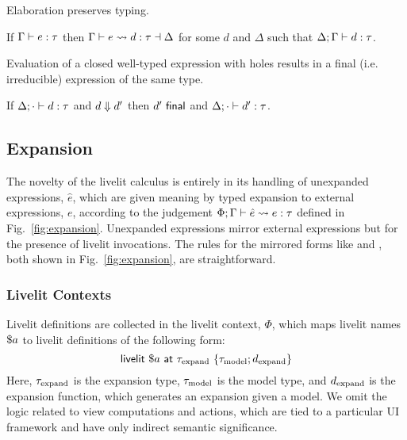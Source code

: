 Elaboration preserves typing.
\begin{theorem}
    If $\Gamma \vdash e : \tau$ then $\Gamma \vdash e \leadsto d : \tau \dashv \Delta$ for some $d$ and $\Delta$ such
    that $\Delta; \Gamma \vdash d : \tau$.
\end{theorem}

Evaluation of a closed well-typed expression with holes results in a final (i.e. irreducible) expression of the same type.
\begin{theorem}[Preservation]
    If $\Delta; \cdot \vdash d : \tau$ and $d \Downarrow d'$ then $d'~\mathsf{final}$ and $\Delta; \cdot \vdash d' : \tau$.
\end{theorem}

\subsection{Expansion}\label{sec:calculus-expansion}

The novelty of the livelit calculus is entirely in its handling of unexpanded expressions,
$\hat e$, which are given meaning by typed expansion to external expressions,
$e$, according to the judgement $\Phi; \Gamma \vdash \hat e \leadsto e : \tau$
defined in Fig.~\ref{fig:expansion}.
Unexpanded expressions mirror external expressions but for the presence of livelit invocations.
The rules for the mirrored 
forms like  and , both shown in Fig.~\ref{fig:expansion},
are straightforward.

\subsubsection{Livelit Contexts}\label{sec:livelit-contexts}

Livelit definitions are collected in the livelit context, $\Phi$, which
maps livelit names $\$a$ to livelit definitions of the following form:
\[ \mathsf{livelit}~\$a~\mathsf{at}~\tau_\text{expand}~\{\tau_\text{model}; d_\text{expand}\} \]
Here, $\tau_\text{expand}$ is the expansion type, $\tau_\text{model}$ is the model type,
and $d_\text{expand}$ is the expansion function, which generates an expansion given a model.
We omit the logic related to view computations and actions, which are tied to a particular 
UI framework and have only indirect semantic significance.

